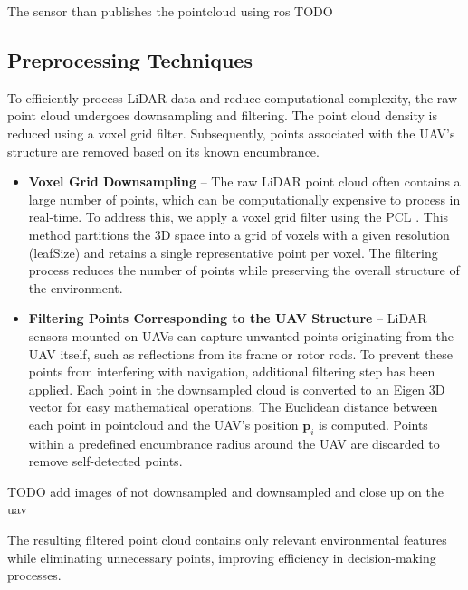            The sensor than publishes the pointcloud using ros TODO
        \subsection{Preprocessing Techniques}
            To efficiently process \ac{LiDAR} data and reduce computational complexity, the raw point cloud undergoes downsampling and filtering. 
            The point cloud density is reduced using a voxel grid filter. 
            Subsequently, points associated with the \ac{UAV}'s structure are removed based on its known encumbrance.
            \begin{itemize}
                \item \textbf{Voxel Grid Downsampling} -- The raw \ac{LiDAR} point cloud often contains a large number of points, which can be computationally expensive to process in real-time. 
                To address this, we apply a voxel grid filter using the \ac{PCL} \cite{pcl_voxelgrid}. 
                This method partitions the 3D space into a grid of voxels with a given resolution (leafSize) and retains a single representative point per voxel. 
                The filtering process reduces the number of points while preserving the overall structure of the environment.
                \item \textbf{Filtering Points Corresponding to the UAV Structure} -- \ac{LiDAR} sensors mounted on \ac{UAV}s can capture unwanted points originating from the \ac{UAV} itself, such as reflections from its frame or rotor rods. 
                To prevent these points from interfering with navigation, additional filtering step has been applied.
                Each point in the downsampled cloud is converted to an Eigen 3D vector for easy mathematical operations. 
                The Euclidean distance between each point in pointcloud and the \ac{UAV}'s position \(\mathbf{p}_i\) is computed. 
                Points within a predefined encumbrance radius around the \ac{UAV} are discarded to remove self-detected points. 
            \end{itemize}
            TODO add images of not downsampled and downsampled and close up on the uav

            The resulting filtered point cloud contains only relevant environmental features while eliminating unnecessary points, improving efficiency in decision-making processes.

